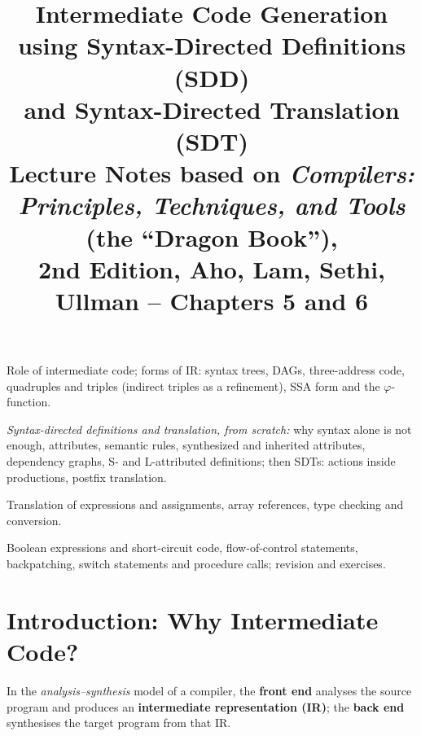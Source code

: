 \documentclass[11pt,a4paper]{article}
\title{\textbf{Intermediate Code Generation\\[2pt] using Syntax-Directed Definitions (SDD) \\ and Syntax-Directed Translation (SDT)}\\[6pt]
\large Lecture Notes based on \emph{Compilers: Principles, Techniques, and Tools} (the ``Dragon Book''),\\ 2nd Edition, Aho, Lam, Sethi, Ullman -- Chapters 5 and 6}
\author{}
\date{}
\begin{document}
\maketitle
\thispagestyle{fancy}

\begin{tcolorbox}[colback=gray!5,colframe=gray!50,title=\textbf{Suggested Lecture Plan (3--4 lectures)}]
\begin{description}[leftmargin=2.2cm,style=nextline]
\item[Lecture 1] Role of intermediate code; forms of IR: syntax trees, DAGs, three-address code, quadruples and triples (indirect triples as a refinement), SSA form and the $\varphi$-function.
\item[Lecture 2] \emph{Syntax-directed definitions and translation, from scratch:} why syntax alone is not enough, attributes, semantic rules, synthesized and inherited attributes, dependency graphs, S- and L-attributed definitions; then SDTs: actions inside productions, postfix translation.
\item[Lecture 3] Translation of expressions and assignments, array references, type checking and conversion.
\item[Lecture 4] Boolean expressions and short-circuit code, flow-of-control statements, backpatching, switch statements and procedure calls; revision and exercises.
\end{description}
\end{tcolorbox}

\tableofcontents
\newpage

\section{Introduction: Why Intermediate Code?}

In the \emph{analysis--synthesis} model of a compiler, the \textbf{front end} analyses the source program and produces an \textbf{intermediate representation (IR)}; the \textbf{back end} synthesises the target program from that IR.
\end{document}
